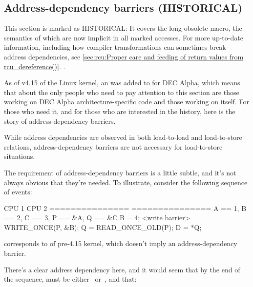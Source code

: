 \subsection{Address-dependency barriers (HISTORICAL)}

\begin{Note}
This section is marked as HISTORICAL\@:
It covers the long-obsolete  macro, the
semantics of which are now implicit in all marked accesses.
For more up-to-date information, including how compiler transformations
can sometimes break address dependencies, see
\cref{sec:rcu:Proper care and feeding of return values from rcu_dereference()}.
.
\end{Note}

As of v4.15 of the Linux kernel, an  was added to
 for DEC Alpha, which means that about the only people who
need to pay attention to this section are those working on DEC Alpha
architecture-specific code and those working on  itself.
For those who need it, and for those who are interested in the history,
here is the story of address-dependency barriers.

\begin{Note}
While address dependencies are observed in both load-to-load and
load-to-store relations, address-dependency barriers are not necessary
for load-to-store situations.
\end{Note}

The requirement of address-dependency barriers is a little subtle, and
it's not always obvious that they're needed.
To illustrate, consider the following sequence of events:

\begin{VerbatimU}
	CPU 1                 CPU 2
	===============	      ===============
	{ A == 1, B == 2, C == 3, P == &A, Q == &C }
	B = 4;
	<write barrier>
	WRITE_ONCE(P, &B);
	                      Q = READ_ONCE_OLD(P);
	                      D = *Q;
\end{VerbatimU}

\begin{Note}
 corresponds to  of
pre-4.15 kernel, which doesn't imply an address-dependency barrier.
\end{Note}

There's a clear address dependency here, and it would seem that by the end of
the sequence,  must be either~ or~, and that:

